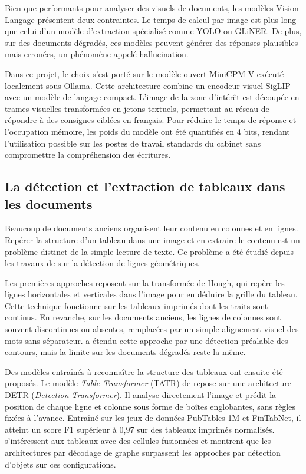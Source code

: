 Bien que performants pour analyser des visuels de documents, les modèles Vision-Langage présentent deux contraintes. Le temps de calcul par image est plus long que celui d'un modèle d'extraction spécialisé comme YOLO ou GLiNER. De plus, sur des documents dégradés, ces modèles peuvent générer des réponses plausibles mais erronées, un phénomène appelé hallucination.

Dans ce projet, le choix s'est porté sur le modèle ouvert MiniCPM-V exécuté localement sous Ollama. Cette architecture combine un encodeur visuel SigLIP avec un modèle de langage compact. L'image de la zone d'intérêt est découpée en trames visuelles transformées en jetons textuels, permettant au réseau de répondre à des consignes ciblées en français. Pour réduire le temps de réponse et l'occupation mémoire, les poids du modèle ont été quantifiés en 4 bits, rendant l'utilisation possible sur les postes de travail standards du cabinet sans compromettre la compréhension des écritures.




\subsection{La détection et l'extraction de tableaux dans les documents}
\label{subsec:table_detection}

Beaucoup de documents anciens organisent leur contenu en colonnes et en lignes. Repérer la structure d'un tableau dans une image et en extraire le contenu est un problème distinct de la simple lecture de texte. Ce problème a été étudié depuis les travaux de \citet{duda_hough_1972} sur la détection de lignes géométriques.

Les premières approches reposent sur la transformée de Hough, qui repère les lignes horizontales et verticales dans l'image pour en déduire la grille du tableau. Cette technique fonctionne sur les tableaux imprimés dont les traits sont continus. En revanche, sur les documents anciens, les lignes de colonnes sont souvent discontinues ou absentes, remplacées par un simple alignement visuel des mots sans séparateur. \citet{canny_edge_1986} a étendu cette approche par une détection préalable des contours, mais la limite sur les documents dégradés reste la même.

Des modèles entraînés à reconnaître la structure des tableaux ont ensuite été proposés. Le modèle \textit{Table Transformer} (TATR) de \citet{smock_table_2022} repose sur une architecture DETR (\textit{Detection Transformer}). Il analyse directement l'image et prédit la position de chaque ligne et colonne sous forme de boîtes englobantes, sans règles fixées à l'avance. Entraîné sur les jeux de données PubTables-1M et FinTabNet, il atteint un score F1 supérieur à 0,97 sur des tableaux imprimés normalisés. \citet{chi_complicated_2019} s'intéressent aux tableaux avec des cellules fusionnées et montrent que les architectures par décodage de graphe surpassent les approches par détection d'objets sur ces configurations.

